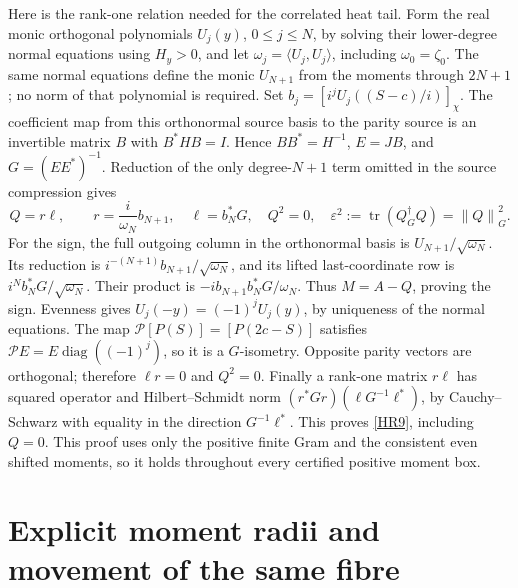 \documentclass[11pt]{article}
\newcommand{\tr}{\operatorname{tr}}\newcommand{\dd}{\dagger_G}
\newcommand{\norm}[1]{\left\lVert#1\right\rVert}
\begin{document}
Here is the rank-one relation needed for the correlated heat tail.
Form the real monic orthogonal polynomials \(U_j(y)\), \(0\le j\le N\),
by solving their lower-degree normal equations using \(H_y>0\), and
let \(\omega_j=\langle U_j,U_j\rangle\), including
\(\omega_0=\zeta_0\). The same normal equations define the monic
\(U_{N+1}\) from the moments through \(2N+1\); no norm of that polynomial
is required. Set \(b_j=[i^jU_j((S-c)/i)]_\chi\). The coefficient map
from this orthonormal source basis to the parity source is an invertible
matrix \(B\) with \(B^*HB=I\). Hence \(BB^*=H^{-1}\),
\(E=JB\), and \(G=(EE^*)^{-1}\). Reduction of the only degree-\(N+1\)
term omitted in the source compression gives
\begin{equation}\tag{HR9}\label{HR9}
Q=r\ell,\qquad r=\frac{i}{\omega_N}b_{N+1},\quad
\ell=b_N^*G,\quad Q^2=0,\quad
\varepsilon^2:=\tr(Q^\dd Q)=\norm Q_G^2.
\end{equation}
For the sign, the full outgoing column in the orthonormal basis is
\(U_{N+1}/\sqrt{\omega_N}\). Its reduction is
\(i^{-(N+1)}b_{N+1}/\sqrt{\omega_N}\), and its lifted last-coordinate
row is \(i^N b_N^*G/\sqrt{\omega_N}\). Their product is
\(-i b_{N+1}b_N^*G/\omega_N\). Thus \(M=A-Q\), proving the sign.
Evenness gives \(U_j(-y)=(-1)^jU_j(y)\), by uniqueness of the normal
equations. The map \(\mathcal P[P(S)]=[P(2c-S)]\) satisfies
\(\mathcal PE=E\operatorname{diag}((-1)^j)\), so it is a \(G\)-isometry.
Opposite parity vectors are orthogonal; therefore \(\ell r=0\) and
\(Q^2=0\). Finally a rank-one matrix \(r\ell\) has squared operator
and Hilbert--Schmidt norm \((r^*Gr)(\ell G^{-1}\ell^*)\), by
Cauchy--Schwarz with equality in the direction \(G^{-1}\ell^*\).
This proves \eqref{HR9}, including \(Q=0\). This proof uses only the
positive finite Gram and the consistent even shifted moments, so it
holds throughout every certified positive moment box.

\section{Explicit moment radii and movement of the same fibre}
\end{document}
